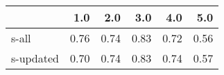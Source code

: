\begin{tabular}{lrrrrr}
\toprule
{} &  1.0 &  2.0 &  3.0 &  4.0 &  5.0 \\
\midrule
s-all     & 0.76 & 0.74 & 0.83 & 0.72 & 0.56 \\
s-updated & 0.70 & 0.74 & 0.83 & 0.74 & 0.57 \\
\bottomrule
\end{tabular}
